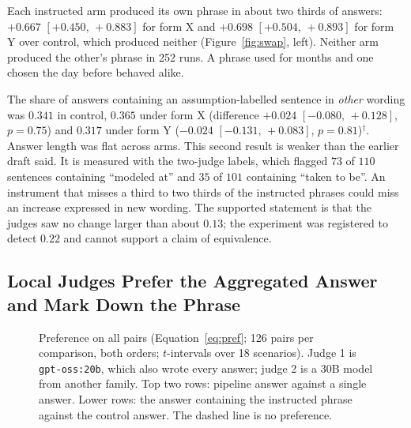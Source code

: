 \documentclass[10pt,twocolumn]{article}
\newcommand{\ci}[2]{\ensuremath{[#1,\,#2]}}
\begin{document}
Each instructed arm produced its own phrase in about two thirds of
answers: $+0.667$ \ci{+0.450}{+0.883} for form X and $+0.698$
\ci{+0.504}{+0.893} for form Y over control, which produced neither
(Figure~\ref{fig:swap}, left). Neither arm produced the other's phrase
in 252 runs. A phrase used for months and one chosen the day before
behaved alike.

The share of answers containing an assumption-labelled sentence in
\emph{other} wording was $0.341$ in control, $0.365$ under form X
(difference $+0.024$ \ci{-0.080}{+0.128}, $p=0.75$) and $0.317$ under
form Y ($-0.024$ \ci{-0.131}{+0.083}, $p=0.81$)$^\dagger$. Answer
length was flat across arms. This second result is weaker than the
earlier draft said. It is measured with the two-judge labels, which
flagged $73$ of $110$ sentences containing ``modeled at'' and $35$ of
$101$ containing ``taken to be''. An instrument that misses a third to
two thirds of the instructed phrases could miss an increase expressed
in new wording. The supported statement is that the judges saw no
change larger than about $0.13$; the experiment was registered to
detect $0.22$ and cannot support a claim of equivalence.

\subsection{Local Judges Prefer the Aggregated Answer and Mark Down the Phrase}
\label{sec:pref}

\begin{figure}[t]
\centering
{}
\caption{Preference on all pairs (Equation~\ref{eq:pref}; 126 pairs per
comparison, both orders; $t$-intervals over 18 scenarios). Judge 1 is \texttt{gpt-oss:20b}, which also
wrote every answer; judge 2 is a 30B model from another family. Top two
rows: pipeline answer against a single answer. Lower rows: the answer
containing the instructed phrase against the control answer. The dashed
line is no preference.}
\label{fig:pref}
\end{figure}
\end{document}
